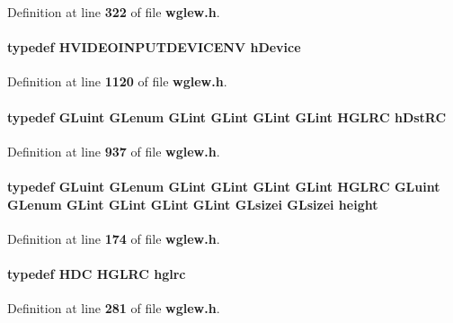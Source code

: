 Definition at line {\bf 322} of file {\bf wglew.\+h}.

\paragraph[{h\+Device}]{\setlength{\rightskip}{0pt plus 5cm}typedef H\+V\+I\+D\+E\+O\+I\+N\+P\+U\+T\+D\+E\+V\+I\+C\+E\+NV {\bf h\+Device}}\label{wglew_8h_a53c0953388d3bab702f8fed88c008d94}


Definition at line {\bf 1120} of file {\bf wglew.\+h}.

\paragraph[{h\+Dst\+RC}]{\setlength{\rightskip}{0pt plus 5cm}typedef {\bf G\+Luint} {\bf G\+Lenum} {\bf G\+Lint} {\bf G\+Lint} {\bf G\+Lint} {\bf G\+Lint} {\bf H\+G\+L\+RC} {\bf h\+Dst\+RC}}\label{wglew_8h_ac6b18426b15ee4e093c27413fe4a74f7}


Definition at line {\bf 937} of file {\bf wglew.\+h}.

\paragraph[{height}]{\setlength{\rightskip}{0pt plus 5cm}typedef {\bf G\+Luint} {\bf G\+Lenum} {\bf G\+Lint} {\bf G\+Lint} {\bf G\+Lint} {\bf G\+Lint} {\bf H\+G\+L\+RC} {\bf G\+Luint} {\bf G\+Lenum} {\bf G\+Lint} {\bf G\+Lint} {\bf G\+Lint} {\bf G\+Lint} {\bf G\+Lsizei} {\bf G\+Lsizei} {\bf height}}\label{wglew_8h_aa214bd63e12f7ddf524c83894fcc69a7}


Definition at line {\bf 174} of file {\bf wglew.\+h}.

\paragraph[{hglrc}]{\setlength{\rightskip}{0pt plus 5cm}typedef {\bf H\+DC} {\bf H\+G\+L\+RC} {\bf hglrc}}\label{wglew_8h_a98897a35ef7e68db0de8b46c262892de}


Definition at line {\bf 281} of file {\bf wglew.\+h}.

